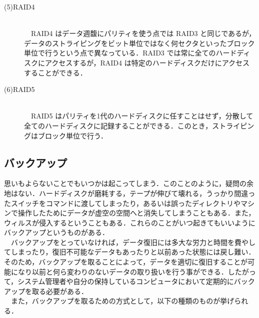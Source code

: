 \documentclass[a4j,titlepage]{jarticle}
\begin{document}
\begin{description}
\item[(5)RAID4]\mbox{}\\
　RAID4 はデータ週馥にパリティを使う点では RAID3 と同じであるが，データのストライピングをビット単位ではなく何セクタといったブロック単位で行うという点で異なっている．RAID3 では常に全てのハードディスクにアクセスするが，RAID4 は特定のハードディスクだけにアクセスすることができる．
  
\item[(6)RAID5]\mbox{}\\
　RAID5 はパリティを1代のハードディスクに任すことはせず，分散して全てのハードディスクに記録することができる．このとき，ストライピングはブロック単位で行う\cite{bib:raidtext}．
  
\end{description}

\newpage
\subsection{バックアップ}
思いもよらないことでもいつかは起こってしまう．このことのように，疑問の余地はない．ハードディスクが磨耗する，テープが伸びて壊れる，うっかり間違ったスイッチをコマンドに渡してしまったり，あるいは誤ったディレクトリやマシンで操作したためにデータが虚空の空間へと消失してしまうこともある．また，ウィルスが侵入するということもある．これらのことがいつ起きてもいいようにバックアップというものがある\cite{bib:servertext}．\\
　バックアップをとっていなければ，データ復旧には多大な労力と時間を費やしてしまったり，復旧不可能なデータもあったりと以前あった状態には戻し難い．そのため，バックアップを取ることによって，データを適切に復旧することが可能になり以前と何ら変わりのないデータの取り扱いを行う事ができる．したがって，システム管理者や自分の保持しているコンピュータにおいて定期的にバックアップを取る必要がある． \\
　また，バックアップを取るための方式として，以下の種類のものが挙げられる．
\end{document}

